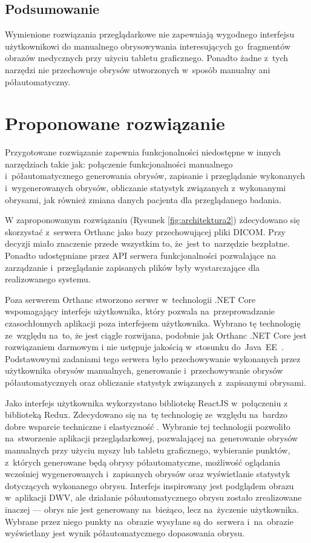 \documentclass[a4paper,11pt,twoside,openright]{report}
\theoremstyle{definition}
\begin{document}
\subsection {Podsumowanie}

Wymienione rozwiązania przeglądarkowe nie zapewniają wygodnego interfejsu użytkownikowi
do manualnego obrysowywania interesujących go~fragmentów obrazów medycznych przy użyciu tabletu graficznego.
Ponadto żadne z~tych narzędzi nie przechowuje obrysów utworzonych w~sposób manualny
ani półautomatyczny.

\section {Proponowane rozwiązanie}

Przygotowane rozwiązanie zapewnia funkcjonalności niedostępne w innych narzędziach
takie jak: połączenie funkcjonalności manualnego i~półautomatycznego generowania obrysów,
zapisanie i przeglądanie wykonanych i~wygenerowanych obrysów,
obliczanie statystyk związanych z~wykonanymi obrysami, jak również zmiana danych pacjenta
dla przeglądanego badania.

W zaproponowanym rozwiązaniu (Rysunek \ref{fig:architektura2}) zdecydowano się skorzystać z~serwera Orthanc jako bazy przechowującej
pliki DICOM. Przy decyzji miało znaczenie przede wszystkim to, że~jest to~narzędzie
bezpłatne. Ponadto udostępniane przez API serwera funkcjonalności pozwalające na
zarządzanie i~przeglądanie zapisanych plików były wystarczające dla realizowanego systemu.

Poza serwerem Orthanc stworzono serwer w~technologii .NET Core \cite{Dotnet}
wspomagający interfejs użytkownika, który pozwala na~przeprowadzanie czasochłonnych
aplikacji poza interfejsem użytkownika. Wybrano tę technologię ze~względu na~to,
że jest ciągle rozwijana, podobnie jak Orthanc .NET Core jest rozwiązaniem darmowym
i nie ustępuje jakością w~stosunku do~Java~EE~\cite{Dlaczego dotnet}.
Podstawowymi zadaniami tego serwera było przechowywanie
wykonanych przez użytkownika obrysów manualnych, generowanie i~przechowywanie
obrysów półautomatycznych oraz obliczanie statystyk związanych z~zapisanymi obrysami.

Jako interfejs użytkownika wykorzystano bibliotekę ReactJS \cite{React} w~połączeniu
z biblioteką Redux\cite{Redux}. Zdecydowano się na~tę technologię ze~względu na~bardzo dobre wsparcie techniczne
i elastyczność \cite{Dlaczego react}. Wybranie tej technologii pozwoliło na~stworzenie
aplikacji przeglądarkowej, pozwalającej na~generowanie obrysów manualnych przy
użyciu myszy lub tabletu graficznego, wybieranie punktów, z~których generowane
będą obrysy półautomatyczne, możliwość oglądania wcześniej wygenerowanych i~zapisanych
obrysów oraz wyświetlanie statystyk dotyczących wykonanego obrysu. Interfejs
inspirowany jest podglądem obrazu w~aplikacji DWV, ale działanie półautomatycznego
obrysu zostało zrealizowane inaczej --- obrys nie jest generowany na~bieżąco, lecz na~życzenie
użytkownika. Wybrane przez niego punkty na~obrazie wysyłane są do~serwera i~na~obrazie wyświetlany jest
wynik półautomatycznego dopasowania obrysu.
\end{document}
